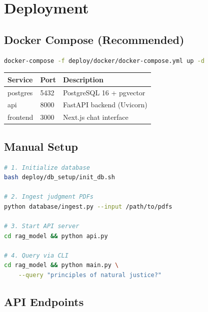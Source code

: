 \documentclass[11pt,a4paper]{article}
\begin{document}
\section{Deployment}

\subsection{Docker Compose (Recommended)}

\begin{lstlisting}[language=bash]
docker-compose -f deploy/docker/docker-compose.yml up -d
\end{lstlisting}

\begin{table}[H]
\centering
\begin{tabular}{lll}
\toprule
\textbf{Service} & \textbf{Port} & \textbf{Description} \\
\midrule
postgres & 5432 & PostgreSQL 16 + pgvector \\
api & 8000 & FastAPI backend (Uvicorn) \\
frontend & 3000 & Next.js chat interface \\
\bottomrule
\end{tabular}
\end{table}

\subsection{Manual Setup}

\begin{lstlisting}[language=bash]
# 1. Initialize database
bash deploy/db_setup/init_db.sh

# 2. Ingest judgment PDFs
python database/ingest.py --input /path/to/pdfs

# 3. Start API server
cd rag_model && python api.py

# 4. Query via CLI
cd rag_model && python main.py \
    --query "principles of natural justice?"
\end{lstlisting}

\subsection{API Endpoints}
\end{document}
